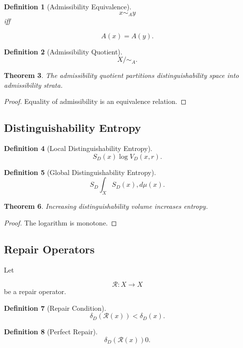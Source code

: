 \documentclass[12pt]{article}
\newtheorem{theorem}{Theorem}[section]
\newtheorem{definition}[theorem]{Definition}
\theoremstyle{remark}
\begin{document}
\begin{definition}[Admissibility Equivalence]
\[
x\sim_A y
\]
iff

\[
A(x)=A(y).
\]
\end{definition}
\begin{definition}[Admissibility Quotient]
\[
X/{\sim_A}.
\]
\end{definition}
\begin{theorem}
The admissibility quotient partitions distinguishability space into admissibility strata.
\end{theorem}

\begin{proof}
Equality of admissibility is an equivalence relation.
\end{proof}

\subsection{Distinguishability Entropy}

\begin{definition}[Local Distinguishability Entropy]
\[
S_D(x)
\log V_D(x,r).
\]
\end{definition}

\begin{definition}[Global Distinguishability Entropy]
\[
S_D
\int_X
S_D(x)
,d\mu(x).
\]
\end{definition}

\begin{theorem}
Increasing distinguishability volume increases entropy.
\end{theorem}

\begin{proof}
The logarithm is monotone.
\end{proof}

\subsection{Repair Operators}

Let

\[
\mathcal R
:
X\rightarrow X
\]
be a repair operator.

\begin{definition}[Repair Condition]
\[
\delta_D(\mathcal R(x))
<
\delta_D(x).
\]
\end{definition}
\begin{definition}[Perfect Repair]
\[
\delta_D(\mathcal R(x))
0. 

\]
\end{definition}
\end{document}
